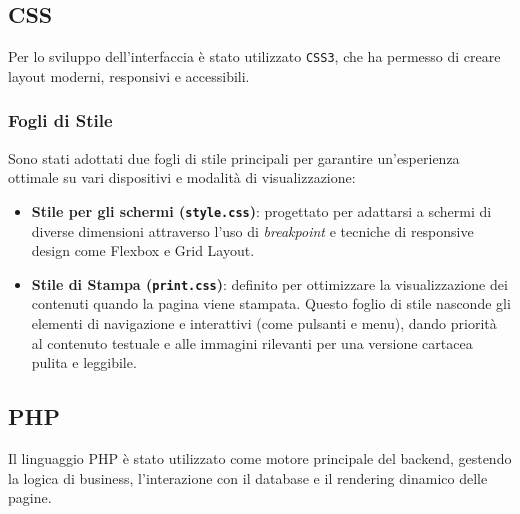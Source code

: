 \subsection{CSS}
Per lo sviluppo dell'interfaccia è stato utilizzato \texttt{CSS3}, che ha permesso di creare layout moderni, responsivi e accessibili.
\subsubsection{Fogli di Stile}
Sono stati adottati due fogli di stile principali per garantire un'esperienza ottimale su vari dispositivi e modalità di visualizzazione:
\begin{itemize}
    \item \textbf{Stile per gli schermi (\texttt{style.css})}: progettato per adattarsi a schermi di diverse dimensioni attraverso l'uso di \textit{breakpoint} e tecniche di responsive design come Flexbox e Grid Layout.
    \item \textbf{Stile di Stampa (\texttt{print.css})}: definito per ottimizzare la visualizzazione dei contenuti quando la pagina viene stampata. Questo foglio di stile nasconde gli elementi di navigazione e interattivi (come pulsanti e menu), dando priorità al contenuto testuale e alle immagini rilevanti per una versione cartacea pulita e leggibile.
\end{itemize}

\subsection{PHP}
Il linguaggio PHP è stato utilizzato come motore principale del backend, gestendo la logica di business, l'interazione con il database e il rendering dinamico delle pagine.

